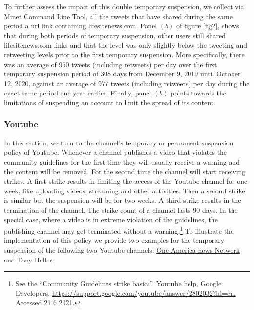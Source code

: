 \documentclass{article}
\begin{document}
\smallskip

To further assess the impact of this double temporary suspension, we collect via Minet Command Line Tool\cite{minet}, all the tweets that have shared during the same period a url link containing lifesitenews.com. Panel $(b)$ of figure \ref{fig2}, shows that during both periods of temporary suspension, other users still shared lifesitenews.com links and that the level was only slightly below the tweeting and retweeting levels prior to the first temporary suspension. More specifically, there was an average of 960 tweets (including retweets) per day over the first temporary suspension period of 308 days from December 9, 2019 until October 12, 2020, against an average of 977 tweets (including retweets) per day during the exact same period one year earlier. Finally, panel $(b)$ points towards the limitations of suspending an account to limit the spread of its content. 

\subsubsection{Youtube}

In this section, we turn to the channel's temporary or permanent suspension policy of Youtube. Whenever a channel publishes a video that violates the community guidelines for the first time they will  usually receive a warning and the content will be removed. For the second time the channel will start receiving strikes. A first strike results in limiting the access of the Youtube channel  for one week, like uploading videos, streaming and other activities. Then a second strike is similar but the suspension will be for two weeks. A third strike results in the termination of the channel. The strike count of a channel lasts 90 days.  In the special case, where a video is in extreme violation of the guidelines, the publishing channel may get terminated without a warning.\footnote{See the ``Community Guidelines strike basics''. Youtube help, Google Developers,  \href{https://support.google.com/youtube/answer/2802032?hl=en. Accessed 21 6 2021}{https://support.google.com/youtube/answer/2802032?hl=en. Accessed 21 6 2021}.} To illustrate the implementation of this policy we provide two examples for the temporary suspension of the following two Youtube channels: \href{https://www.youtube.com/channel/UCNbIDJNNgaRrXOD7VllIMRQ}{One America news Network} and \href{https://www.youtube.com/user/TonyHeller1}{Tony Heller}.

\smallskip
\end{document}
